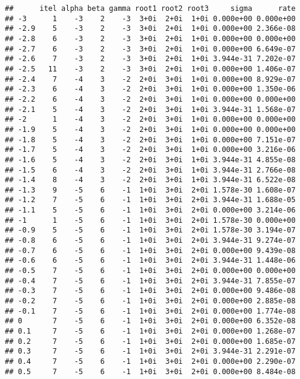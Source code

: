\documentclass[
  12pt,
]{article}
\begin{document}
\footnotesize

\begin{verbatim}
##      itel alpha beta gamma root1 root2 root3     sigma      rate
## -3      1    -3    2    -3  3+0i  2+0i  1+0i 0.000e+00 0.000e+00
## -2.9    5    -3    2    -3  3+0i  2+0i  1+0i 0.000e+00 2.366e-08
## -2.8    6    -3    2    -3  3+0i  2+0i  1+0i 0.000e+00 0.000e+00
## -2.7    6    -3    2    -3  3+0i  2+0i  1+0i 0.000e+00 6.649e-07
## -2.6    7    -3    2    -3  3+0i  2+0i  1+0i 3.944e-31 7.202e-07
## -2.5   11    -3    2    -3  3+0i  2+0i  1+0i 0.000e+00 1.406e-07
## -2.4    7    -4    3    -2  2+0i  3+0i  1+0i 0.000e+00 8.929e-07
## -2.3    6    -4    3    -2  2+0i  3+0i  1+0i 0.000e+00 1.350e-06
## -2.2    6    -4    3    -2  2+0i  3+0i  1+0i 0.000e+00 0.000e+00
## -2.1    5    -4    3    -2  2+0i  3+0i  1+0i 3.944e-31 1.568e-07
## -2      1    -4    3    -2  2+0i  3+0i  1+0i 0.000e+00 0.000e+00
## -1.9    5    -4    3    -2  2+0i  3+0i  1+0i 0.000e+00 0.000e+00
## -1.8    5    -4    3    -2  2+0i  3+0i  1+0i 0.000e+00 7.151e-07
## -1.7    5    -4    3    -2  2+0i  3+0i  1+0i 0.000e+00 3.216e-06
## -1.6    5    -4    3    -2  2+0i  3+0i  1+0i 3.944e-31 4.855e-08
## -1.5    6    -4    3    -2  2+0i  3+0i  1+0i 3.944e-31 2.766e-08
## -1.4    8    -4    3    -2  2+0i  3+0i  1+0i 3.944e-31 6.522e-08
## -1.3    9    -5    6    -1  1+0i  3+0i  2+0i 1.578e-30 1.608e-07
## -1.2    7    -5    6    -1  1+0i  3+0i  2+0i 3.944e-31 1.688e-05
## -1.1    5    -5    6    -1  1+0i  3+0i  2+0i 0.000e+00 3.214e-06
## -1      1    -5    6    -1  1+0i  3+0i  2+0i 1.578e-30 0.000e+00
## -0.9    5    -5    6    -1  1+0i  3+0i  2+0i 1.578e-30 3.194e-07
## -0.8    6    -5    6    -1  1+0i  3+0i  2+0i 3.944e-31 9.274e-07
## -0.7    6    -5    6    -1  1+0i  3+0i  2+0i 0.000e+00 9.439e-08
## -0.6    6    -5    6    -1  1+0i  3+0i  2+0i 3.944e-31 1.448e-06
## -0.5    7    -5    6    -1  1+0i  3+0i  2+0i 0.000e+00 0.000e+00
## -0.4    7    -5    6    -1  1+0i  3+0i  2+0i 3.944e-31 7.855e-07
## -0.3    7    -5    6    -1  1+0i  3+0i  2+0i 0.000e+00 9.486e-08
## -0.2    7    -5    6    -1  1+0i  3+0i  2+0i 0.000e+00 2.885e-08
## -0.1    7    -5    6    -1  1+0i  3+0i  2+0i 0.000e+00 1.774e-08
## 0       7    -5    6    -1  1+0i  3+0i  2+0i 0.000e+00 6.352e-08
## 0.1     7    -5    6    -1  1+0i  3+0i  2+0i 0.000e+00 1.268e-07
## 0.2     7    -5    6    -1  1+0i  3+0i  2+0i 0.000e+00 1.685e-07
## 0.3     7    -5    6    -1  1+0i  3+0i  2+0i 3.944e-31 2.291e-07
## 0.4     7    -5    6    -1  1+0i  3+0i  2+0i 0.000e+00 2.290e-07
## 0.5     7    -5    6    -1  1+0i  3+0i  2+0i 0.000e+00 8.484e-08

\end{verbatim}
\end{document}
